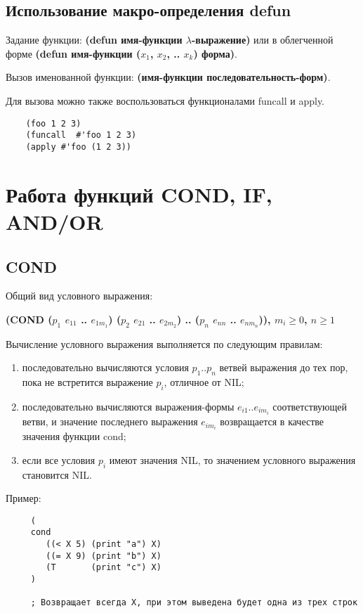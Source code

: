 \subsection{Использование макро-определения defun}

Задание функции: \textbf{(defun имя-функции $\lambda$-выражение)} или в облегченной форме \textbf{(defun имя-функции ($x_1$, $x_2$, .. $x_k$) форма)}.

Вызов именованной функции: \textbf{(имя-функции последовательность-форм)}. 

Для вызова можно также воспользоваться функционалами funcall и apply.

\begin{lstlisting}
    (foo 1 2 3)
    (funcall  #'foo 1 2 3)
    (apply #'foo (1 2 3))
\end{lstlisting}

\section{Работа функций COND, IF, AND/OR}

\subsection{COND}

Общий вид условного выражения:  

\textbf{(COND ($p_1$ $e_{11}$ .. $e_{1m_1}$) ($p_2$ $e_{21}$ .. $e_{2m_2}$) .. ($p_n$ $e_{nn}$ .. $e_{nm_n}$)), $m_i \geq 0$, $n \geq  1$}

Вычисление условного выражения выполняется по следующим правилам:

\begin{enumerate}
    \item последовательно вычисляются условия $p_1 .. p_n$ ветвей выражения до тех пор, пока не встретится выражение $p_i$, отличное от NIL;
    \item последовательно вычисляются выражения-формы $e_{i1} .. e_{im_i}$ соответствующей ветви, и значение последнего выражения $e_{im_i}$ возвращается в качестве значения функции cond;
    \item если все условия $p_i$ имеют значения NIL, то значением условного выражения становится NIL.
\end{enumerate}

Пример:
\begin{lstlisting}
     (
     cond 
        ((< X 5) (print "a") X)
        ((= X 9) (print "b") X)
        (T       (print "c") X)
     )

     ; Возвращает всегда X, при этом выведена будет одна из трех строк
\end{lstlisting}

